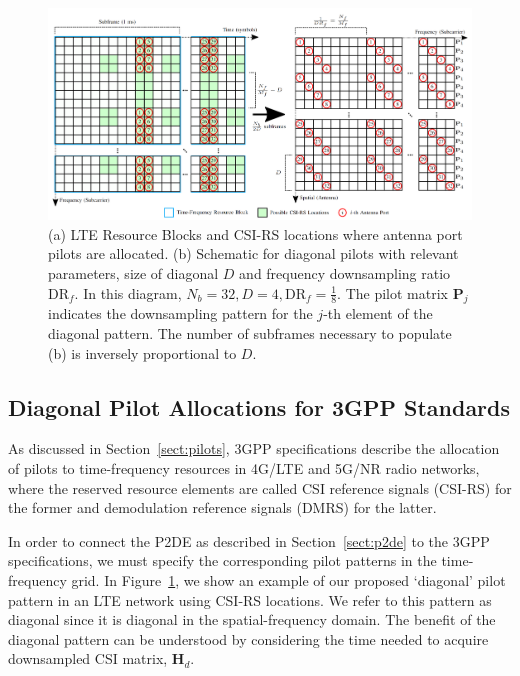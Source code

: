 \begin{figure}[!hbtp]
    \centering
    \includegraphics[width=\linewidth]{images/01_p2d_pilots_diag_with_resource_grid.png}
    \caption{(a) LTE Resource Blocks and CSI-RS locations where antenna port pilots are allocated. (b) Schematic for diagonal pilots with relevant parameters, size of diagonal $D$ and frequency downsampling ratio $\text{DR}_f$. In this diagram, $N_b=32, D=4, \text{DR}_f=\frac 18$. The pilot matrix $\mathbf{P}_j$ indicates the downsampling pattern for the $j$-th element of the diagonal pattern. The number of subframes necessary to populate (b) is inversely proportional to $D$.}
    \label{fig:p2d_diag}
\end{figure}

\subsection{Diagonal Pilot Allocations for 3GPP Standards} \label{sect:diag}

As discussed in Section~\ref{sect:pilots}, 3GPP specifications describe the allocation of pilots to time-frequency resources in 4G/LTE \cite{ref:3gpp.36.211, ref:Asplund2020} and 5G/NR \cite{ref:3GPPTS38.211V15.8.0} radio networks, where the reserved resource elements are called CSI reference signals (CSI-RS) for the former and demodulation reference signals (DMRS) for the latter.

In order to connect the P2DE as described in Section~\ref{sect:p2de} to the 3GPP specifications, we must specify the corresponding pilot patterns in the time-frequency grid. In Figure~\ref{fig:p2d_diag}, we show an example of our proposed `diagonal' pilot pattern in an LTE network using CSI-RS locations. We refer to this pattern as diagonal since it is diagonal in the spatial-frequency domain. The benefit of the diagonal pattern can be understood by considering the time needed to acquire downsampled CSI matrix, $\mathbf{H}_d$.

